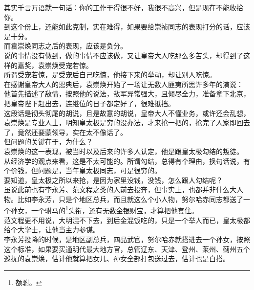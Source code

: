 \begin{multicols}{\theparacolNo}
其实千言万语就一句话：你的工作干得很不好，我很不高兴，但是现在不能收拾你。\\

到这个份上，还能如此克制，实在难得，如果要给崇祯同志的表现打分的话，应该是十分。\\

而袁崇焕同志之后的表现，应该是负分。\\

说的事情没有做到，做的事情不应该做，又让皇帝大人吃那么多苦头，却得到了这样的嘉奖，袁崇焕受宠若惊。\\

所谓受宠若惊，是受宠后自己吃惊，他接下来的举动，却让别人吃惊。\\

在感谢皇帝大人的恩典后，袁崇焕开始了一场让无数人匪夷所思许多年的演说：\\

他首先描述了敌情，按照他的说法，敌军异常强大，且倾尽全力，准备拿下北京，把皇帝陛下赶出去，连继位的日子都定好了，很难抵挡。\\

这段话是彻头彻尾的胡说，且是故意的胡说，皇帝大人不懂业务，或许还会乱想，袁崇焕是专业人士，明知皇太极是穷的没办法，才来抢一把的，抢完了人家即回去了，竟然还要蒙领导，实在太不像话了。\\

但问题的关键在于，为什么？\\

袁崇焕的这一表现，被当时以及后来的许多人认定，他是跟皇太极勾结的叛徒。\\

从经济学的观点来看，这是不太可能的。所谓勾结，总得有个理由，换句话说，有个价钱，但问题是，当年皇太极同志，可是很穷的。\\

要知道，皇太极之所以来抢，是因为家里没钱，没钱，怎么跟人勾结呢？\\

虽说此前也有李永芳、范文程之类的人前去投奔，但事实上，也都并非什么大人物。比如李永芳，只是个地区总兵，而且就这么个小人物，努尔哈赤同志都送了一个孙女，一个驸马的\footnote{额驸。}头衔，还有无数金银财宝，才算把他套住。\\

范文程更不用说，大明混不下去，到后金混饭吃的，只是一个举人而已，皇太极都给个大学士，让他当主力参谋。\\

李永芳投降的时候，是地区副总兵，四品武官，努尔哈赤就搭进去一个孙女，按照这个标准，如果要买通明代最大地方官，总管辽东、天津、登州、莱州、蓟州五个巡抚的袁崇焕，估计他就算把女儿、孙女全部打包送过去，估计也是白搭。\\


\end{multicols}
